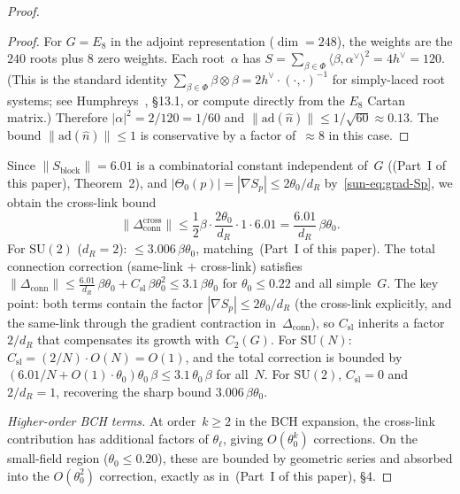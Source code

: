 \documentclass[11pt]{article}
\theoremstyle{definition}
\newcommand{\SU}{\mathrm{SU}}
\newcommand{\ad}{\mathrm{ad}}
\begin{document}
\begin{proof}
\begin{proof}
For $G=E_8$ in the adjoint representation ($\dim=248$),
the weights are the $240$ roots plus $8$ zero weights.
Each root~$\alpha$ has $S=\sum_{\beta\in\Phi}
\langle\beta,\alpha^\vee\rangle^2=4h^\vee=120$.
(This is the standard identity
$\sum_{\beta\in\Phi}\beta\otimes\beta
=2h^\vee\cdot(\cdot,\cdot)^{-1}$
for simply-laced root systems; see
Humphreys~\cite{Humphreys}, \S13.1, or compute
directly from the $E_8$ Cartan matrix.)
Therefore $|\alpha|^2=2/120=1/60$ and
$\|\ad(\hat{n})\|\le 1/\sqrt{60}\approx 0.13$.
The bound $\|\ad(\hat{n})\|\le 1$ is conservative
by a factor of~$\approx 8$ in this case.
\end{proof}

Since $\|S_{\mathrm{block}}\|=6.01$ is a combinatorial
constant independent of~$G$ ((Part~I of this paper),
Theorem~2), and
$|\Theta_0(p)|=|\nabla S_p|\le 2\theta_0/d_R$
by~\eqref{sun-eq:grad-Sp},
we obtain the cross-link bound
\begin{equation}
\|\Delta_{\mathrm{conn}}^{\text{cross}}\|
\le\frac{1}{2}\beta\cdot\frac{2\theta_0}{d_R}
\cdot 1\cdot 6.01
=\frac{6.01}{d_R}\,\beta\theta_0.
\end{equation}
For $\SU(2)$ ($d_R=2$): $\le 3.006\,\beta\theta_0$,
matching~\textup{(Part~I of this paper)}.
The total connection correction (same-link $+$ cross-link)
satisfies
$\|\Delta_{\mathrm{conn}}\|\le
\frac{6.01}{d_R}\,\beta\theta_0
+C_{\mathrm{sl}}\,\beta\theta_0^2
\le 3.1\,\beta\theta_0$
for $\theta_0\le 0.22$ and all simple~$G$.
The key point: both terms contain the factor
$|\nabla S_p|\le 2\theta_0/d_R$ (the cross-link
explicitly, and the same-link through the gradient
contraction in~$\Delta_{\mathrm{conn}}$), so
$C_{\mathrm{sl}}$ inherits a factor $2/d_R$ that
compensates its growth with~$C_2(G)$.
For $\SU(N)$: $C_{\mathrm{sl}}=(2/N)\cdot O(N)=O(1)$,
and the total correction is bounded by
$(6.01/N+O(1)\cdot\theta_0)\theta_0\,\beta
\le 3.1\,\theta_0\,\beta$
for all~$N$.  For $\SU(2)$, $C_{\mathrm{sl}}=0$ and
$2/d_R=1$, recovering the sharp bound
$3.006\,\beta\theta_0$.

\emph{Higher-order BCH terms.}
At order~$k\ge 2$ in the BCH expansion, the cross-link
contribution has additional factors of $\theta_\ell$,
giving $O(\theta_0^{k})$ corrections.  On the small-field
region ($\theta_0\le 0.20$), these are bounded by geometric
series and absorbed into the $O(\theta_0^2)$
correction, exactly as in~(Part~I of this paper), \S4.
\end{proof}
\end{document}
